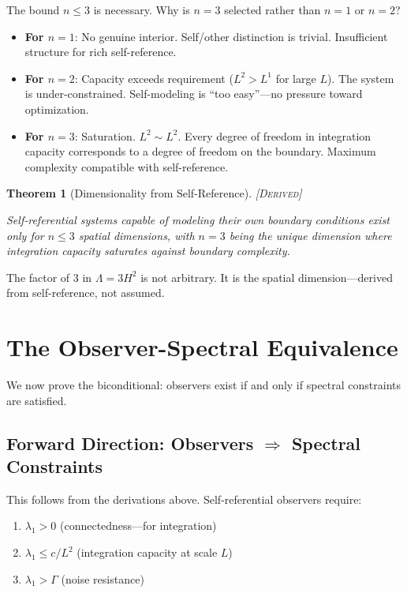 \documentclass[11pt,a4paper]{article}
\newtheorem{theorem}{Theorem}[section]
\theoremstyle{definition}
\theoremstyle{remark}
\begin{document}
The bound $n \leq 3$ is necessary. Why is $n = 3$ selected rather than $n = 1$ or $n = 2$?

\begin{itemize}
    \item \textbf{For $n = 1$}: No genuine interior. Self/other distinction is trivial. Insufficient structure for rich self-reference.

    \item \textbf{For $n = 2$}: Capacity exceeds requirement ($L^2 > L^1$ for large $L$). The system is under-constrained. Self-modeling is ``too easy''---no pressure toward optimization.

    \item \textbf{For $n = 3$}: Saturation. $L^2 \sim L^2$. Every degree of freedom in integration capacity corresponds to a degree of freedom on the boundary. Maximum complexity compatible with self-reference.
\end{itemize}

\begin{theorem}[Dimensionality from Self-Reference]
\textsc{[Derived]}

Self-referential systems capable of modeling their own boundary conditions exist only for $n \leq 3$ spatial dimensions, with $n = 3$ being the unique dimension where integration capacity saturates against boundary complexity.
\end{theorem}

The factor of 3 in $\Lambda = 3H^2$ is not arbitrary. It is the spatial dimension---derived from self-reference, not assumed.

\section{The Observer-Spectral Equivalence}

We now prove the biconditional: observers exist if and only if spectral constraints are satisfied.

\subsection{Forward Direction: Observers $\Rightarrow$ Spectral Constraints}

This follows from the derivations above. Self-referential observers require:
\begin{enumerate}
    \item[(i)] $\lambda_1 > 0$ (connectedness---for integration)
    \item[(ii)] $\lambda_1 \leq c/L^2$ (integration capacity at scale $L$)
    \item[(iii)] $\lambda_1 > \Gamma$ (noise resistance)
\end{enumerate}
\end{document}
